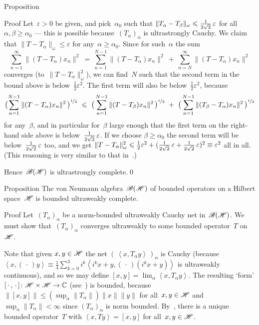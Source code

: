 \documentclass[a]{subfiles}
\begin{document}
\begin{parsec}
\begin{point}[bh-us-complete]{Proposition}
\begin{point}{Proof}
Let~$\varepsilon>0$ be given,
and pick~$\alpha_0$
such that $\|T_\alpha-T_\beta\|_\omega \leq 
\smash{\frac{1}{2\sqrt{2}}}\,\varepsilon$
for all~$\alpha,\beta\geq \alpha_0$
--- this is possible  because~$(T_\alpha)_\alpha$ is ultrastrongly Cauchy.
We claim that $\|T-T_\alpha\|_\omega \leq \varepsilon$
for any~$\alpha\geq \alpha_0$.
Since for such~$\alpha$
the sum
\begin{equation*}
	\sum_{n=1}^\infty \|(T-T_\alpha)x_n\|^2 
	\ = \ 
	\sum_{n=1}^{N-1} \|(T-T_\alpha)x_n\|^2
	\ +\ 
	\sum_{n=N}^\infty
	\|(T-T_\alpha)x_n\|^2
\end{equation*}
converges (to~$\|T-T_\alpha\|_\omega^2$),
we can find~$N$ such that the second term in the bound above
is below~$\frac{1}{2}\varepsilon^2$.
The first term will also be below~$\frac{1}{2}\varepsilon^2$,
because
\begin{equation*}
	\bigl(\sum_{n=1}^{N-1} \|(T - T_\alpha)x_n\|^2\,\bigr)^{\nicefrac{1}{2}}
	\ \leq\ 
\bigl(\,
\sum_{n=1}^{N-1} \|(T-T_{\beta})x_n\|^2
\,\bigr)^{\nicefrac{1}{2}}
\ +\ 
\bigl(\,
\sum_{n=1}^{N-1} \|(T_\beta-T_\alpha)x_n\|^2
\,\bigr)^{\nicefrac{1}{2}}
\end{equation*}
for any~$\beta$,
and in particular for~$\beta$
large enough that the first term on the right-hand side above
is below~$\smash{\frac{1}{2\sqrt{2}}}\,\varepsilon$.
If we choose $\beta\geq \alpha_0$
the second term will be below~$\smash{\frac{1}{2\sqrt{2}}}\,\varepsilon$ too,
and we get $\|T-T_\alpha\|_\omega^2 \leq \frac{1}{2}\varepsilon^2
+ (\smash{\frac{1}{2\sqrt{2}}\,\varepsilon 
+ \frac{1}{2\sqrt{2}}\,\varepsilon})^2
\equiv \varepsilon^2$ 
all in all.
(This reasoning is very similar to that in~.)

Hence~$\scrB(\scrH)$ is ultrastrongly complete.\qed
\end{point}
\end{point}
\begin{point}[bh-bounded-uw-complete]{Proposition}%
The von Neumann algebra~$\scrB(\scrH)$
of bounded operators on a Hilbert space~$\scrH$
is bounded ultraweakly complete.
\begin{point}{Proof}%
Let~$(T_\alpha)_\alpha$ be a norm-bounded ultraweakly Cauchy net
in~$\scrB(\scrH)$.
We must show that~$(T_\alpha)_\alpha$
converges ultraweakly
to some bounded operator~$T$ on~$\scrH$.

Note that given $x,y\in\scrH$
the net $(\,\left<x,T_\alpha y\right>\,)_\alpha$
is Cauchy
(because $\left<x,(\,\cdot\,)y\right>
\equiv \frac{1}{4}\sum_{k=0}^3 i^k\left<i^kx+y,(\,\cdot\,)(i^kx+y)\right>$
is ultraweakly continuous),
and so we may define $[x,y] = \lim_\alpha \left<x,T_\alpha y\right>$.
The resulting `form'
$[\,\cdot\,,\,\cdot\,]\colon \scrH\times\scrH\to \C$
(see~\sref{chilb-form})
is bounded, 
because~$\left\|[x,y]\right\| \leq (\sup_\alpha \|T_\alpha\|)\|x\|\|y\|$
for all~$x,y\in\scrH$
and $\sup_\alpha\|T_\alpha\|<\infty$
since $(T_\alpha)_\alpha$
is norm bounded.
By~,
there is a unique bounded operator~$T$
with $\left<x,Ty\right>=[x,y]$
for all~$x,y\in\scrH$.


\end{point}
\end{point}
\end{parsec}
\end{document}
